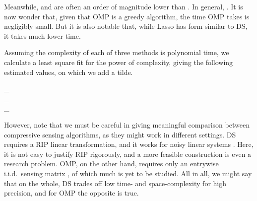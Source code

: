 Meanwhile,  and  are often an order of magnitude lower than .
In general, .
It is now wonder that, given that OMP is a greedy algorithm, the time OMP takes is negligibly small.
But it is also notable that, while Lasso has form similar to DS, it takes much lower time.

Assuming the complexity of each of three methods is polynomial time, we calculate a least square fit for the power of complexity, giving the following estimated values, on which we add a tilde.

 {
_{} \eqsim {}  \\
_{} \eqsim {}  \\
_{} \eqsim {}  \\
}

However, note that we must be careful in giving meaningful comparison between compressive sensing algorithms, as they might work in different settings.
DS requires a RIP linear transformation, and it works for noisy linear systems \cite {CaT07}.
Here, it is not easy to justify RIP rigorously, and a more feasible construction is even a research problem.
OMP, on the other hand, requires only an entrywise i.i.d.\ sensing matrix \cite {TrG07a}, of which much is yet to be studied.
All in all, we might say that on the whole, DS trades off low time- and space-complexity for high precision, and for OMP the opposite is true.








